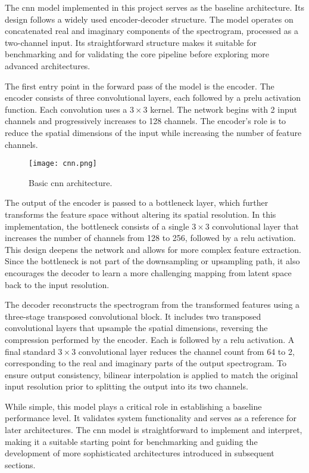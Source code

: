 The \gls{cnn} model implemented in this project serves as the baseline architecture. Its design follows a widely used encoder-decoder structure. The model operates on concatenated real and imaginary components of the spectrogram, processed as a two-channel input. Its straightforward structure makes it suitable for benchmarking and for validating the core pipeline before exploring more advanced architectures.

The first entry point in the forward pass of the model is the encoder. The encoder consists of three convolutional layers, each followed by a \gls{prelu} activation function. Each convolution uses a \(3 \times 3\) kernel. The network begins with 2 input channels and progressively increases to 128 channels. The encoder's role is to reduce the spatial dimensions of the input while increasing the number of feature channels.

\begin{figure}[h]
    \centering
    \texttt{[image: cnn.png]}
    \caption{\label{fig:cnn}Basic \gls{cnn} architecture.}
\end{figure}

The output of the encoder is passed to a bottleneck layer, which further transforms the feature space without altering its spatial resolution. In this implementation, the bottleneck consists of a single \(3 \times 3\) convolutional layer that increases the number of channels from 128 to 256, followed by a \gls{relu} activation. This design deepens the network and allows for more complex feature extraction. Since the bottleneck is not part of the downsampling or upsampling path, it also encourages the decoder to learn a more challenging mapping from latent space back to the input resolution.

The decoder reconstructs the spectrogram from the transformed features using a three-stage transposed convolutional block. It includes two transposed convolutional layers that upsample the spatial dimensions, reversing the compression performed by the encoder. Each is followed by a \gls{relu} activation. A final standard \(3 \times 3\) convolutional layer reduces the channel count from 64 to 2, corresponding to the real and imaginary parts of the output spectrogram. To ensure output consistency, bilinear interpolation is applied to match the original input resolution prior to splitting the output into its two channels.

While simple, this model plays a critical role in establishing a baseline performance level. It validates system functionality and serves as a reference for later architectures. The \gls{cnn} model is straightforward to implement and interpret, making it a suitable starting point for benchmarking and guiding the development of more sophisticated architectures introduced in subsequent sections.

